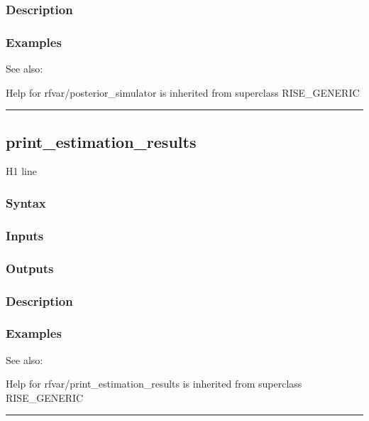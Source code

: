 \documentclass[letterpaper,10pt,english]{sphinxmanual}
\begin{document}
\subsubsection{Description}
\label{classes/models/@rfvar/rfvar:id90}

\subsubsection{Examples}
\label{classes/models/@rfvar/rfvar:id91}
See also:

Help for rfvar/posterior\_simulator is inherited from superclass RISE\_GENERIC


\bigskip\hrule{}\bigskip



\subsection{print\_estimation\_results}
\label{classes/models/@rfvar/rfvar:print-estimation-results}\label{classes/models/@rfvar/rfvar:id92}
H1 line


\subsubsection{Syntax}
\label{classes/models/@rfvar/rfvar:id93}

\subsubsection{Inputs}
\label{classes/models/@rfvar/rfvar:id94}

\subsubsection{Outputs}
\label{classes/models/@rfvar/rfvar:id95}

\subsubsection{Description}
\label{classes/models/@rfvar/rfvar:id96}

\subsubsection{Examples}
\label{classes/models/@rfvar/rfvar:id97}
See also:

Help for rfvar/print\_estimation\_results is inherited from superclass RISE\_GENERIC


\bigskip\hrule{}\bigskip
\end{document}
